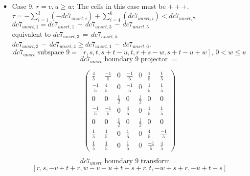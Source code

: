 \documentclass[preprint]{iucr}              %
\begin{document}
{\begin{itemize}
     \item{Case 9. $r=v, u \ge w$:  The cells in this case must be $+++$. \\
     $\tau=-\sum_{i=1}^3(-dc7_{unsrt,i})+\sum_{i=4}^6(dc7_{unsrt,i}) < dc7_{unsrt,7}$\\
     $dc7_{unsrt,1}=dc7_{unsrt,1}\,+\,dc7_{unsrt,3}\,-\,dc7_{unsrt,5}$\\
          equivalent to
     $dc7_{unsrt,3}\,=\,dc7_{unsrt,5}$\\
     $dc7_{unsrt,3}\,-\,dc7_{unsrt,4} \ge
     dc7_{unsrt,1}\,-\,dc7_{unsrt,6}$.
     \[dc7_{unsrt} \text{ subspace 9}=[r,s,t,s+t-u,t,r+s-w,s+t-u+w],\, 0 < w \leq u \]
     \[dc7_{unsrt} \text{ boundary 9 projector } =\]
\begin{center}
\begin{equation*}
\begin{pmatrix}
\frac{4}{5}&\frac{-1}{5}&0&\frac{-1}{5}&0&\frac{1}{5}&\frac{1}{5}\\[.25em]
\frac{-1}{5}&\frac{4}{5}&0&\frac{-1}{5}&0&\frac{1}{5}&\frac{1}{5}\\[.25em]
0&0&\frac{1}{2}&0&\frac{1}{2}&0&0\\[.25em]
\frac{-1}{5}&\frac{-1}{5}&0&\frac{4}{5}&0&\frac{1}{5}&\frac{1}{5}\\[.25em]
0&0&\frac{1}{2}&0&\frac{1}{2}&0&0\\[.25em]
\frac{1}{5}&\frac{1}{5}&0&\frac{1}{5}&0&\frac{4}{5}&\frac{-1}{5}\\[.25em]
\frac{1}{5}&\frac{1}{5}&0&\frac{1}{5}&0&\frac{-1}{5}&\frac{4}{5}
\end{pmatrix}
\end{equation*}
\end{center}


    \[dc7_{unsrt} \text{ boundary 9 transform}=\]
    \[ [r,s,-v+t+r,w-v-u+t+s+r,t,-w+s+r,-u+t+s]\]
     }
     

\end{itemize}}
\end{document}
